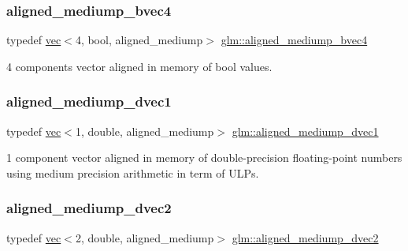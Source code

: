 \subsubsection{\texorpdfstring{aligned\+\_\+mediump\+\_\+bvec4}{aligned\_mediump\_bvec4}}
{\footnotesize\ttfamily typedef \hyperlink{structglm_1_1vec}{vec}$<$4, bool, aligned\+\_\+mediump$>$ \hyperlink{group__gtc__type__aligned_gaa5fba8713e0381efe85996169fbc2bcc}{glm\+::aligned\+\_\+mediump\+\_\+bvec4}}



4 components vector aligned in memory of bool values. 

\mbox{\label{group__gtc__type__aligned_gad123cfb2803e67ae9f973bbd57bf86e3}} 
\subsubsection{\texorpdfstring{aligned\+\_\+mediump\+\_\+dvec1}{aligned\_mediump\_dvec1}}
{\footnotesize\ttfamily typedef \hyperlink{structglm_1_1vec}{vec}$<$1, double, aligned\+\_\+mediump$>$ \hyperlink{group__gtc__type__aligned_gad123cfb2803e67ae9f973bbd57bf86e3}{glm\+::aligned\+\_\+mediump\+\_\+dvec1}}



1 component vector aligned in memory of double-\/precision floating-\/point numbers using medium precision arithmetic in term of U\+L\+Ps. 

\mbox{\label{group__gtc__type__aligned_gab67579d5dcc90f9e4ab28cc92a467eee}} 
\subsubsection{\texorpdfstring{aligned\+\_\+mediump\+\_\+dvec2}{aligned\_mediump\_dvec2}}
{\footnotesize\ttfamily typedef \hyperlink{structglm_1_1vec}{vec}$<$2, double, aligned\+\_\+mediump$>$ \hyperlink{group__gtc__type__aligned_gab67579d5dcc90f9e4ab28cc92a467eee}{glm\+::aligned\+\_\+mediump\+\_\+dvec2}}



